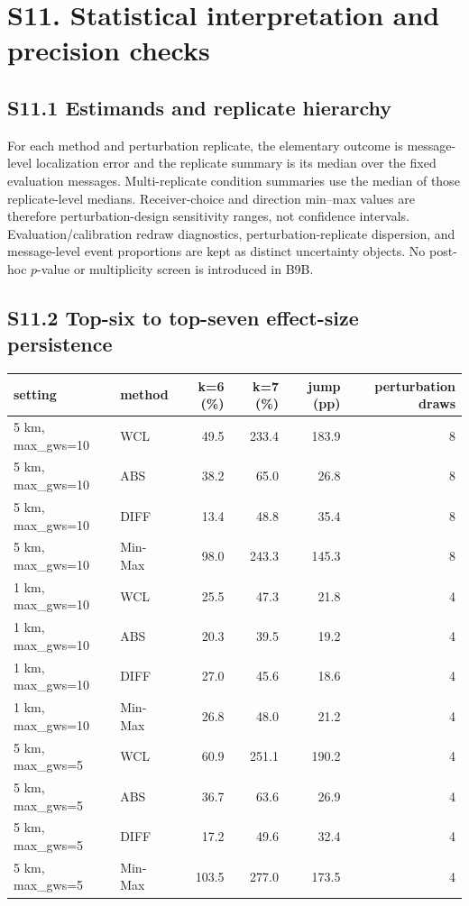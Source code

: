 \documentclass[journal,onecolumn,10pt]{IEEEtran}
\begin{document}
\section*{S11. Statistical interpretation and precision checks}\label{s11.-statistical-interpretation-and-precision-checks}

\subsection*{S11.1 Estimands and replicate hierarchy}

For each method and perturbation replicate, the elementary outcome is message-level localization error and the replicate summary is its median over the fixed evaluation messages. Multi-replicate condition summaries use the median of those replicate-level medians. Receiver-choice and direction min--max values are therefore perturbation-design sensitivity ranges, not confidence intervals. Evaluation/calibration redraw diagnostics, perturbation-replicate dispersion, and message-level event proportions are kept as distinct uncertainty objects. No post-hoc $p$-value or multiplicity screen is introduced in B9B.

\subsection*{S11.2 Top-six to top-seven effect-size persistence}

\begin{center}\begin{minipage}{\textwidth}\centering
{}

\begin{tabular}{@{}llrrrr@{}}
\toprule\noalign{}
setting & method & k=6 (\%) & k=7 (\%) & jump (pp) & perturbation draws \\
\midrule\noalign{}

5 km, max\_gws=10 & WCL & 49.5 & 233.4 & 183.9 & 8 \\
5 km, max\_gws=10 & ABS & 38.2 & 65.0 & 26.8 & 8 \\
5 km, max\_gws=10 & DIFF & 13.4 & 48.8 & 35.4 & 8 \\
5 km, max\_gws=10 & Min-Max & 98.0 & 243.3 & 145.3 & 8 \\
1 km, max\_gws=10 & WCL & 25.5 & 47.3 & 21.8 & 4 \\
1 km, max\_gws=10 & ABS & 20.3 & 39.5 & 19.2 & 4 \\
1 km, max\_gws=10 & DIFF & 27.0 & 45.6 & 18.6 & 4 \\
1 km, max\_gws=10 & Min-Max & 26.8 & 48.0 & 21.2 & 4 \\
5 km, max\_gws=5 & WCL & 60.9 & 251.1 & 190.2 & 4 \\
5 km, max\_gws=5 & ABS & 36.7 & 63.6 & 26.9 & 4 \\
5 km, max\_gws=5 & DIFF & 17.2 & 49.6 & 32.4 & 4 \\
5 km, max\_gws=5 & Min-Max & 103.5 & 277.0 & 173.5 & 4 \\
\bottomrule
\end{tabular}
\end{minipage}\end{center}
\end{document}

